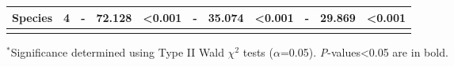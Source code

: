 \begin{landscape}
\begin{table}[]
{\begin{tabular}{p{2.5cm}p{0.5cm}p{2cm}p{1.5cm}p{1.5cm}p{2cm}p{1.5cm}p{1.5cm}p{2cm}p{1.5cm}p{1.5cm}}
                 Species & \multicolumn{1}{r}{4}
                 & \multicolumn{1}{r}{-} & \multicolumn{1}{r}{72.128} &  \multicolumn{1}{r}{\textbf{\textless{}0.001}}
                 & \multicolumn{1}{r}{-} & \multicolumn{1}{r}{35.074} &  \multicolumn{1}{r}{\textbf{\textless{}0.001}}
                 & \multicolumn{1}{r}{-} & \multicolumn{1}{r}{29.869} &  \multicolumn{1}{r}{\textbf{\textless{}0.001}}
                 \\
                 \hline

                 &&&&&&&&&& 
                 \\
    \end{tabular}}
    \label{tab:table3.1}
\end{table}
\begin{singlespace}
    \noindent $^*$Significance determined using Type II Wald $\chi^{2}$ tests ($\alpha$=0.05). \textit{P}-values<0.05 are in bold.       
\end{singlespace}
\end{landscape}
\clearpage

